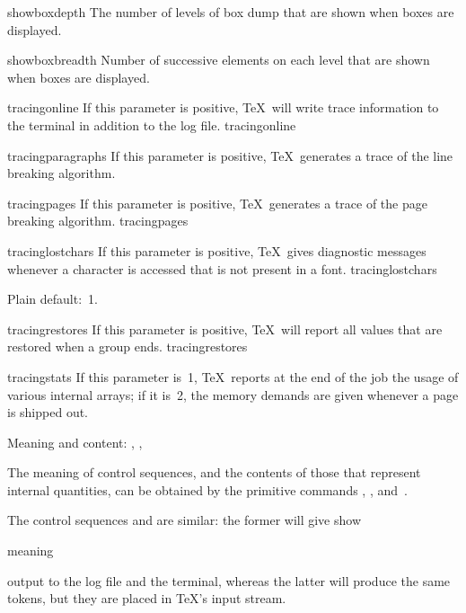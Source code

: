 \item showboxdepth  
      The number of levels of box dump that are shown when 
      boxes are displayed.

\item showboxbreadth 
      Number of successive elements on each level that are shown when 
      boxes are displayed.

\item tracingonline 
      If this parameter is positive, \TeX\ will write trace      
      information to the terminal in addition to the log file.
      \csterm tracingonline\par

\item tracingparagraphs 
      If this parameter is positive, \TeX\ generates      
      a trace of the line breaking algorithm.

\item tracingpages 
      If this parameter is positive, \TeX\ generates      
      a trace of the page breaking algorithm.
      \csterm tracingpages\par

\item tracinglostchars 
      If this parameter is positive, \TeX\ gives      
      diagnostic messages whenever a character is accessed that      
      is not present in a font.
      \csterm tracinglostchars\par
      Plain default:~1.

\item tracingrestores 
      If this parameter is positive, \TeX\ will report      
      all values that are restored when a group ends.
      \csterm tracingrestores\par

\item tracingstats 
      If this parameter is~1, \TeX\ reports at the      
      end of the job the usage of various internal arrays;
      if it is~2, the memory demands are given whenever
      a page is shipped out.

\inventstop

\point Meaning and content: \cs{\show}, \cs{\showthe}, \cs{\meaning}

The meaning of control sequences, and the contents of those
that represent internal quantities, can be obtained
by the primitive commands , ,
and~.

The control sequences  and  are similar:
\alt
the former will give
\csterm show\par\csterm meaning\par
output to the log file and the terminal, whereas the latter
will produce the same tokens, but they are placed in \TeX's
input stream.

